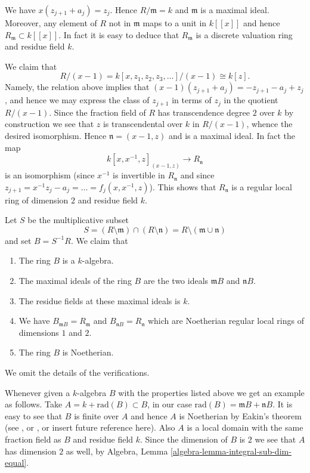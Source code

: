 \medskip\noindent
We have $x(z_{j + 1} + a_j) = z_j$. Hence $R/\mathfrak m = k$
and $\mathfrak m$ is a maximal ideal. Moreover, any element of $R$
not in $\mathfrak m$ maps to a unit in $k[[x]]$ and hence
$R_{\mathfrak m} \subset k[[x]]$. In fact it is easy to deduce
that $R_{\mathfrak m}$ is a discrete valuation ring and residue
field $k$.

\medskip\noindent
We claim that
$$
R/(x - 1) =
k[x, z_1, z_2, z_3, \ldots ]/(x - 1)
\cong
k[z].
$$
Namely, the relation above implies that
$(x - 1)(z_{j + 1} + a_j) = -z_{j + 1} - a_j + z_j$, and hence
we may express the class of $z_{j + 1}$ in terms of $z_j$ in
the quotient $R/(x - 1)$. Since the fraction field of $R$
has transcendence degree $2$ over $k$ by construction we see that $z$ is
transcendental over $k$ in $R/(x - 1)$, whence the desired isomorphism.
Hence $\mathfrak n = (x - 1, z)$ and is a maximal ideal. In fact the
map
$$
k[x, x^{-1}, z]_{(x - 1, z)} \longrightarrow R_{\mathfrak n}
$$
is an isomorphism (since $x^{-1}$ is invertible in $R_{\mathfrak n}$
and since $z_{j + 1} = x^{-1}z_j - a_j = \ldots = f_j(x, x^{-1}, z)$).
This shows that $R_{\mathfrak n}$ is a regular local ring
of dimension $2$ and residue field $k$.

\medskip\noindent
Let $S$ be the multiplicative subset
$$
S =
(R \setminus \mathfrak m) \cap (R \setminus \mathfrak n) =
R \setminus (\mathfrak m \cup \mathfrak n)
$$
and set $B = S^{-1}R$. We claim that
\begin{enumerate}
\item The ring $B$ is a $k$-algebra.
\item The maximal ideals of the ring $B$ are the two ideals
$\mathfrak mB$ and $\mathfrak nB$.
\item The residue fields at these maximal ideals is $k$.
\item We have $B_{\mathfrak mB} = R_{\mathfrak m}$
and $B_{\mathfrak nB} = R_{\mathfrak n}$
which are Noetherian regular local rings of dimensions $1$ and $2$.
\item The ring $B$ is Noetherian.
\end{enumerate}
We omit the details of the verifications.

\medskip\noindent
Whenever given a $k$-algebra $B$ with the properties listed above we
get an example as follows. Take $A = k + \text{rad}(B) \subset B$,
in our case $\text{rad}(B) = \mathfrak mB + \mathfrak nB$.
It is easy to see that $B$ is finite over $A$ and hence $A$ is
Noetherian by Eakin's theorem (see \cite{Eakin}, or
\cite[Appendix A1]{Nagata}, or insert future reference here).
Also $A$ is a local domain with the same fraction field as $B$ and
residue field $k$. Since the dimension of $B$ is $2$ we see that $A$
has dimension $2$ as well, by
Algebra, Lemma \ref{algebra-lemma-integral-sub-dim-equal}.

